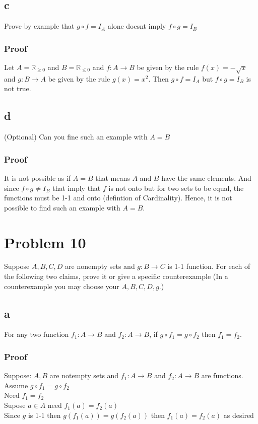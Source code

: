 \documentclass{article}
\begin{document}
\subsection*{c}
Prove by example that $g \circ f = I_A$ alone doesnt imply $f \circ g = I_B$
\subsubsection*{Proof}
Let $A = \mathbb{R}_{\geq 0}$ and $B = \mathbb{R}_{\leq 0}$ and $f: A \rightarrow B$ be given by the rule $f(x) = -\sqrt{x}$ and $g: B \rightarrow A$ be given by the rule $g(x) = x^2$. Then $g \circ f = I_A$ but $f \circ g = I_B$ is not true.
\subsection*{d}
(Optional) Can you fine such an example with $A = B$
\subsubsection*{Proof}
It is not possible as if $A = B$ that means $A$ and $B$ have the same elements. And since $f \circ g \neq I_B$ that imply that $f$ is not onto but for two sets to be equal, the functions must be 1-1 and onto (defintion of Cardinality). Hence, it is not possible to find such an example with $A = B$.
\section*{Problem 10}
Suppose $A,B,C,D$ are nonempty sets and $g: B \rightarrow C$ is 1-1 function.
For each of the following two claims, prove it or give a specific counterexample (In a counterexample you may choose your $A,B,C,D,g$.)
\subsection*{a}
For any two function $f_1: A \rightarrow B $ and $f_2: A \rightarrow B$, if $g \circ f_1 = g \circ f_2$ then $f_1 = f_2$.
\subsubsection*{Proof}
Suppose: $A,B$ are notempty sets and $f_1: A \rightarrow B $ and $f_2: A \rightarrow B$ are functions. \\
Assume $g \circ f_1 = g \circ f_2$\\
Need $f_1 = f_2$\\
Supose $a \in A$ need $f_1(a) = f_2(a)$\\
Since $g$ is 1-1 then $g(f_1(a)) = g(f_2(a))$ then $f_1(a) = f_2(a)$ as desired
\end{document}
